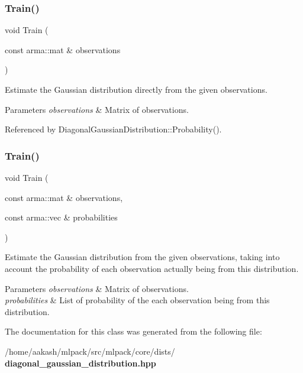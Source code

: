 \subsubsection{Train()\hspace{0.1cm}{\footnotesize\ttfamily [1/2]}}
{\footnotesize\ttfamily void Train (\begin{DoxyParamCaption}\item[{const arma\+::mat \&}]{observations }\end{DoxyParamCaption})}



Estimate the Gaussian distribution directly from the given observations. 


\begin{DoxyParams}{Parameters}
{\em observations} & Matrix of observations. \\
\hline
\end{DoxyParams}


Referenced by Diagonal\+Gaussian\+Distribution\+::\+Probability().

\mbox{\label{classmlpack_1_1distribution_1_1DiagonalGaussianDistribution_ad71152f8853ac60c92a165ed72384125}} 
\subsubsection{Train()\hspace{0.1cm}{\footnotesize\ttfamily [2/2]}}
{\footnotesize\ttfamily void Train (\begin{DoxyParamCaption}\item[{const arma\+::mat \&}]{observations,  }\item[{const arma\+::vec \&}]{probabilities }\end{DoxyParamCaption})}



Estimate the Gaussian distribution from the given observations, taking into account the probability of each observation actually being from this distribution. 


\begin{DoxyParams}{Parameters}
{\em observations} & Matrix of observations. \\
\hline
{\em probabilities} & List of probability of the each observation being from this distribution. \\
\hline
\end{DoxyParams}


The documentation for this class was generated from the following file\+:\begin{DoxyCompactItemize}
\item 
/home/aakash/mlpack/src/mlpack/core/dists/\textbf{ diagonal\+\_\+gaussian\+\_\+distribution.\+hpp}\end{DoxyCompactItemize}
